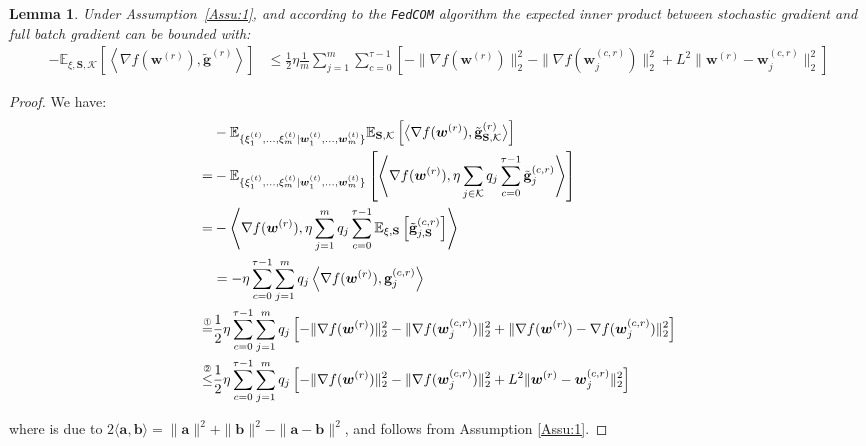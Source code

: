 \documentclass[twoside]{article}
\newtheorem{lemma}{Lemma}
\begin{document}
\begin{lemma}\label{lemma:cross-inner-bound-unbiased}
  Under Assumption~\ref{Assu:1}, and according to the \texttt{FedCOM} algorithm the expected inner product between stochastic gradient and full batch gradient can be bounded with:
\begin{align}
    - \mathbb{E}_{\xi,\mathbf{S},\mathcal{K}}\left[\left\langle\nabla f({\boldsymbol{w}}^{(r)}),{{\tilde{\mathbf{g}}}^{(r)}}\right\rangle\right]&\leq \frac{1}{2}\eta\frac{1}{m}\sum_{j=1}^m\sum_{c=0}^{\tau-1}\left[-\|\nabla f({\boldsymbol{w}}^{(r)})\|_2^2-\|\nabla{f}(\boldsymbol{w}_j^{(c,r)})\|_2^2+L^2\|{\boldsymbol{w}}^{(r)}-\boldsymbol{w}_j^{(c,r)}\|_2^2\right]\label{eq:lemma3-thm2}
\end{align}

\end{lemma}
\begin{proof}
We have:
\begin{align}
    &-\mathbb{E}_{\{{\xi}^{(t)}_{1}, \ldots, {\xi}^{(t)}_{m}|{\boldsymbol{w}}^{(t)}_{1},\ldots,  {\boldsymbol{w}}^{(t)}_{m}\}} \mathbb{E}_{\mathbf{S},\mathcal{K}}\left[ \big\langle\nabla f({\boldsymbol{w}}^{(r)}),\tilde{\mathbf{g}}_{\mathbf{S},\mathcal{K}}^{(r)}\big\rangle\right]\nonumber\\
    =&-\mathbb{E}_{\{{\xi}^{(t)}_{1}, \ldots, {\xi}^{(t)}_{m}|{\boldsymbol{w}}^{(t)}_{1},\ldots,  {\boldsymbol{w}}^{(t)}_{m}\}}\left[\left\langle \nabla f({\boldsymbol{w}}^{(r)}),\eta\sum_{j\in\mathcal{K}}q_j\sum_{c=0}^{\tau-1}\tilde{\mathbf{g}}_j^{(c,r)}\right\rangle\right]\nonumber\\
    =&-\left\langle \nabla f({\boldsymbol{w}}^{(r)}),\eta\sum_{j=1}^mq_j\sum_{c=0}^{\tau-1}\mathbb{E}_{\xi,\mathbf{S}}\left[\tilde{\mathbf{g}}_{j,\mathbf{S}}^{(c,r)}\right]\right\rangle\nonumber\\
        &=-\eta\sum_{c=0}^{\tau-1}\sum_{j=1}^mq_j\left\langle \nabla f({\boldsymbol{w}}^{(r)}),{\mathbf{g}}_j^{(c,r)}\right\rangle\nonumber\\ 
     \stackrel{\text{\ding{192}}}{=}&\frac{1}{2}\eta\sum_{c=0}^{\tau-1}\sum_{j=1}^mq_j\left[-\|\nabla f({\boldsymbol{w}}^{(r)})\|_2^2-\|{{\nabla{f}}}(\boldsymbol{w}_j^{(c,r)})\|_2^2+\|\nabla f({\boldsymbol{w}}^{(r)})-\nabla{f}(\boldsymbol{w}_j^{(c,r)})\|_2^2\right]\nonumber\\
    \stackrel{\text{\ding{193}}}{\leq}&\frac{1}{2}\eta\sum_{c=0}^{\tau-1}\sum_{j=1}^mq_j\left[-\|\nabla f({\boldsymbol{w}}^{(r)})\|_2^2-\|\nabla{f}(\boldsymbol{w}_j^{(c,r)})\|_2^2+L^2\|{\boldsymbol{w}}^{(r)}-\boldsymbol{w}_j^{(c,r)}\|_2^2\right]
   \label{eq:bounding-cross-no-redundancy}
\end{align}

where  is due to $2\langle \mathbf{a},\mathbf{b}\rangle=\|\mathbf{a}\|^2+\|\mathbf{b}\|^2-\|\mathbf{a}-\mathbf{b}\|^2$, and  follows from Assumption \ref{Assu:1}.
\end{proof}
\end{document}
